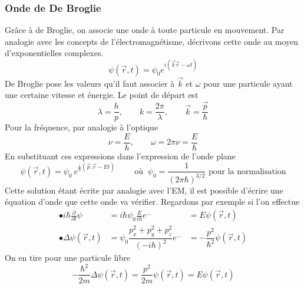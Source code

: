 		\subsubsection{Onde de De Broglie}
		Grâce à de Broglie, on associe une onde à toute particule en mouvement.
		Par analogie avec les concepts de l'électromagnétisme, décrivons cette onde au moyen d'exponentielles complexes.
		\begin{equation}
		\psi(\vec{r},t) = \psi_0e^{i(\vec{k}\vec{r}-\omega t)}
		\end{equation}
		De Broglie pose les valeurs qu'il faut associer à $\vec k$ et $\omega$ pour une particule ayant 
		une certaine vitesse et énergie. Le point de départ est
		\begin{equation}
		\lambda = \dfrac{h}{p},\qquad k=\dfrac{2\pi}{\lambda},\qquad \vec k=\dfrac{\vec{p}}{\hbar}
		\end{equation}
		Pour la fréquence, par analogie à l'optique
		\begin{equation}
		\nu = \dfrac{E}{h},\qquad \omega = 2\pi\nu = \dfrac{E}{\hbar}
		\end{equation}
		En substituant ces expressions dans l'expression de l'onde plane
		\begin{equation}
		\psi(\vec{r},t) = \psi_0\ e^{\frac{i}{\hbar}\left(\vec{p}.\vec{r}-Et\right)}\qquad \text{ où }\ \psi_0 =
		\dfrac{1}{(2\pi\hbar)^{3/2}} \text{ pour la normalisation}
		\end{equation}
		Cette solution étant écrite par analogie avec l'EM, il est possible d'écrire une équation 
		d'onde que cette onde va vérifier. Regardons par exemple si l'on effectue
		\begin{equation}
		\begin{array}{lll}
		\bullet i\hbar\frac{\partial}{\partial t}\psi &= i\hbar \psi_0\frac{E}{i\hbar}e^{\dots} &=
		E\psi(\vec{r},t)\\
		\bullet \Delta \psi(\vec{r},t) &= \psi_0\dfrac{p_x^2+p_y^2+p_z^2}{(-i\hbar)^2}e^{\dots} &= -
		\dfrac{p^2}{\hbar^2}\psi(\vec{r},t)
		\end{array}
		\end{equation}
		On en tire pour une particule libre
		\begin{equation}
		-\dfrac{\hbar^2}{2m}\Delta \psi(\vec{r},t) = \dfrac{p^2}{2m}\psi(\vec{r},t) = E\psi(\vec{r},t)
		\end{equation}
